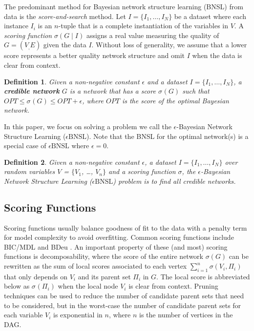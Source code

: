 \documentclass[letterpaper]{article}
\newcommand{\opt}{\mathit{OPT}}
\newcommand{\graph}{\mathit{G}}
\newcommand{\vertex}[1]{V_{#1}}
\newcommand{\vertices}{\mathit{V}}
\newcommand{\edges}{\mathit{E}}
\newcommand{\parents}{\Pi}
\newcommand{\problem}{\mathit{\epsilon}\text{BNSL}}
\newcommand{\score}[2]{\sigma_{#1}({#2})}
\newtheorem{definition}{Definition}
\begin{document}
The predominant method for Bayesian network structure learning (BNSL) from data is
the \emph{score-and-search} method.
Let 
$I =
\{I_1, \ldots, I_N\}$ be a dataset where each instance $I_i$ is an $n$-tuple that is a
complete instantiation of the variables in $\vertices$. A \emph{scoring
function} $\sigma( \graph \mid I )$ assigns a real value measuring 
the quality of $\graph=(\vertex,\edges)$ given the data $I$.
Without loss of generality, we assume that a lower score
represents a better quality network structure and omit $I$ when the data is clear from context. 

\begin{definition}
Given a non-negative constant $\epsilon$ and a dataset $I = \{I_1, \ldots, I_N\}$, a \textbf{credible  network} $G$ is a network that has a score $\score{}{\graph}$ such that $\opt \leq \score{}{\graph} \leq \opt + \epsilon$, where $\opt$ is the score of the optimal Bayesian network.  
\end{definition}

In this paper, we focus on solving a problem we call the $\epsilon$-Bayesian Network Structure Learning ($\problem$). Note that the BNSL for the optimal network(s) is a special case of $\problem$ where $\epsilon=0$.
\begin{definition}
Given a non-negative constant $\epsilon$, a dataset $I = \{I_1, \ldots, I_N\}$ 
over random variables $\vertices$ = $\{V_{1}$, \ldots, $V_{n}\}$ and a scoring 
function $\sigma$, the $\epsilon$-Bayesian Network Structure Learning ($\problem$) 
problem is to find all credible networks.
\end{definition}


\subsection{Scoring Functions}

Scoring functions usually balance goodness of fit to
the data with a penalty term for model complexity
to avoid overfitting. Common scoring functions
include BIC/MDL \cite{LamB94,Schwarz78} and BDeu
\cite{Buntine91,HeckermanGC95}. An important property of these
(and most) scoring functions is decomposability,
where the score of the entire network
$\sigma( \graph )$
can be rewritten as the sum of local scores associated to each vertex
$\sum_{i = 1}^{n} \sigma(\vertex{i},\parents_i )$
that only depends on $\vertex{i}$ and its parent set $\parents_{i}$ in
$\graph$. The local score is abbreviated below as $\score{}{\parents_i}$  when the local node $\vertex{i}$ is clear from context.
Pruning techniques can be used to reduce the
number of candidate parent sets that need to be considered,
but in the worst-case the number of candidate parent sets
for each variable $\vertex{i}$ is exponential in $n$, where $n$
is the number of vertices in the DAG.
\end{document}
